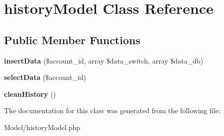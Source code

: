 \hypertarget{classhistory_model}{\section{history\-Model Class Reference}
\label{classhistory_model}
}
\subsection*{Public Member Functions}
\begin{DoxyCompactItemize}
\item 
\hypertarget{classhistory_model_a35350490d1e0f0597011c9b01f8a5810}{{\bfseries insert\-Data} (\$account\-\_\-id, array \$data\-\_\-switch, array \$data\-\_\-db)}\label{classhistory_model_a35350490d1e0f0597011c9b01f8a5810}

\item 
\hypertarget{classhistory_model_a4025876f36ec47a3b8fc7c98d6d3f60c}{{\bfseries select\-Data} (\$account\-\_\-id)}\label{classhistory_model_a4025876f36ec47a3b8fc7c98d6d3f60c}

\item 
\hypertarget{classhistory_model_a2761da68d4037399261d683ab4f9b2b7}{{\bfseries clean\-History} ()}\label{classhistory_model_a2761da68d4037399261d683ab4f9b2b7}

\end{DoxyCompactItemize}


The documentation for this class was generated from the following file\-:\begin{DoxyCompactItemize}
\item 
Model/history\-Model.\-php\end{DoxyCompactItemize}
